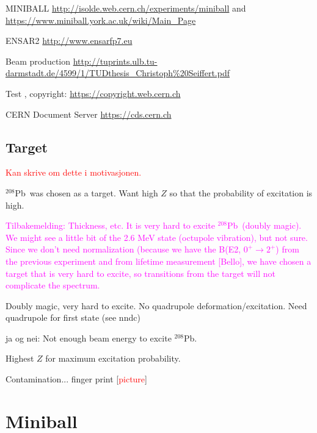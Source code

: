 \documentclass[twoside,english]{uiofysmaster/uiofysmaster}
\newcommand{\Pb}{$^{208}$Pb}
\begin{document}
\bigskip

MINIBALL \url{http://isolde.web.cern.ch/experiments/miniball} and \url{https://www.miniball.york.ac.uk/wiki/Main_Page}

\bigskip

ENSAR2 \url{http://www.ensarfp7.eu}

\bigskip

Beam production \url{http://tuprints.ulb.tu-darmstadt.de/4599/1/TUDthesis_Christoph%20Seiffert.pdf}

\bigskip

Test \cite{CERN-AC}, copyright: \url{https://copyright.web.cern.ch}

\bigskip

CERN Document Server  \url{https://cds.cern.ch}


\subsection{Target}

\textcolor{red}{Kan skrive om dette i motivasjonen.}

\Pb\ was chosen as a target. Want high $Z$ so that the probability of excitation is high. \newline

\textcolor{Magenta}{Tilbakemelding: \newline
Thickness, etc. \newline
It is very hard to excite \Pb ~(doubly magic). We might see a little bit of the 2.6 MeV state (octupole vibration), but not sure. \newline
Since we don't need normalization (because we have the B(E2, $0^+ \rightarrow 2^+$) from the previous experiment and from lifetime measurement [Bello], we have chosen a target that is very hard to excite, so transitions from the target will not complicate the spectrum.}

Doubly magic, very hard to excite. No quadrupole deformation/excitation. Need quadrupole for first state (see nndc)

ja og nei: Not enough beam energy to excite \Pb. \newline

Highest $Z$ for maximum excitation probability.


Contamination... finger print [\textcolor{red}{picture}]


\section{Miniball}
\end{document}
